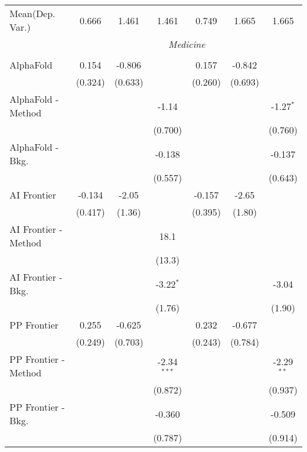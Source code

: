 \begin{tabular}{lcccccc}
Mean(Dep. Var.) & 0.666 & 1.461 & 1.461 & 0.749 & 1.665 & 1.665 \\
 & \multicolumn{6}{c}{\textit{Medicine}} \\ \\
   AlphaFold            & 0.154   & -0.806  &               & 0.157   & -0.842      &   \\   
                        & (0.324) & (0.633) &               & (0.260) & (0.693)     &   \\   
   AlphaFold - Method   &         &         & -1.14         &         &             & -1.27$^{*}$\\   
                        &         &         & (0.700)       &         &             & (0.760)\\   
   AlphaFold - Bkg.     &         &         & -0.138        &         &             & -0.137\\   
                        &         &         & (0.557)       &         &             & (0.643)\\   
   AI Frontier          & -0.134  & -2.05   &               & -0.157  & -2.65       &   \\   
                        & (0.417) & (1.36)  &               & (0.395) & (1.80)      &   \\   
   AI Frontier - Method &         &         & 18.1          &         &             &   \\   
                        &         &         & (13.3)        &         &             &   \\   
   AI Frontier - Bkg.   &         &         & -3.22$^{*}$   &         &             & -3.04\\   
                        &         &         & (1.76)        &         &             & (1.90)\\   
   PP Frontier          & 0.255   & -0.625  &               & 0.232   & -0.677      &   \\   
                        & (0.249) & (0.703) &               & (0.243) & (0.784)     &   \\   
   PP Frontier - Method &         &         & -2.34$^{***}$ &         &             & -2.29$^{**}$\\   
                        &         &         & (0.872)       &         &             & (0.937)\\   
   PP Frontier - Bkg.   &         &         & -0.360        &         &             & -0.509\\   
                        &         &         & (0.787)       &         &             & (0.914)\\   

\end{tabular}
